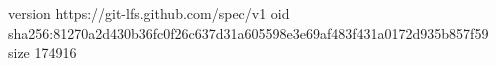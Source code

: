 version https://git-lfs.github.com/spec/v1
oid sha256:81270a2d430b36fc0f26c637d31a605598e3e69af483f431a0172d935b857f59
size 174916
